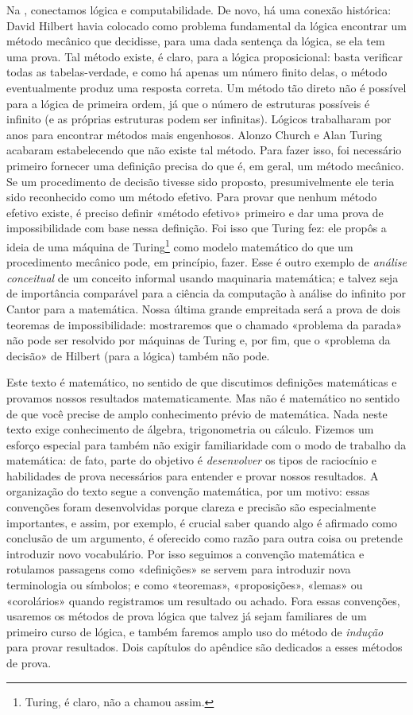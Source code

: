 Na , conectamos lógica e computabilidade. De
novo, há uma conexão histórica: David Hilbert havia colocado como
problema fundamental da lógica encontrar um método mecânico que
decidisse, para uma dada sentença da lógica, se ela tem uma prova. Tal
método existe, é claro, para a lógica proposicional: basta verificar
todas as tabelas-verdade, e como há apenas um número finito delas, o
método eventualmente produz uma resposta correta. Um método tão direto
não é possível para a lógica de primeira ordem, já que o número de
estruturas possíveis é infinito (e as próprias estruturas podem ser
infinitas). Lógicos trabalharam por anos para encontrar métodos mais
engenhosos. Alonzo Church e Alan Turing acabaram estabelecendo que não
existe tal método. Para fazer isso, foi necessário primeiro fornecer uma
definição precisa do que é, em geral, um método mecânico. Se um
procedimento de decisão tivesse sido proposto, presumivelmente ele
teria sido reconhecido como um método efetivo. Para provar que nenhum
método efetivo existe, é preciso definir «método efetivo» primeiro e
dar uma prova de impossibilidade com base nessa definição. Foi isso
que Turing fez: ele propôs a ideia de uma máquina de
Turing\footnote{Turing, é claro, não a chamou assim.} como modelo
matemático do que um procedimento mecânico pode, em princípio, fazer.
Esse é outro exemplo de \emph{análise conceitual} de um conceito
informal usando maquinaria matemática; e talvez seja de importância
comparável para a ciência da computação à análise do infinito por
Cantor para a matemática. Nossa última grande empreitada será a prova
de dois teoremas de impossibilidade: mostraremos que o chamado
«problema da parada» não pode ser resolvido por máquinas de Turing e,
por fim, que o «problema da decisão» de Hilbert (para a lógica)
também não pode.

Este texto é matemático, no sentido de que discutimos definições
matemáticas e provamos nossos resultados matematicamente. Mas não é
matemático no sentido de que você precise de amplo conhecimento prévio
de matemática. Nada neste texto exige conhecimento de álgebra,
trigonometria ou cálculo. Fizemos um esforço especial para também não
exigir familiaridade com o modo de trabalho da matemática: de fato,
parte do objetivo é \emph{desenvolver} os tipos de raciocínio e
habilidades de prova necessários para entender e provar nossos
resultados. A organização do texto segue a convenção matemática, por um
motivo: essas convenções foram desenvolvidas porque clareza e precisão
são especialmente importantes, e assim, por exemplo, é crucial saber
quando algo é afirmado como conclusão de um argumento, é oferecido
como razão para outra coisa ou pretende introduzir novo vocabulário.
Por isso seguimos a convenção matemática e rotulamos passagens como
«definições» se servem para introduzir nova terminologia ou símbolos; e
como «teoremas», «proposições», «lemas» ou «corolários» quando
registramos um resultado ou achado. Fora essas convenções, usaremos os
métodos de prova lógica que talvez já sejam familiares de um primeiro
curso de lógica, e também faremos amplo uso do método de
\emph{indução} para provar resultados. Dois capítulos do apêndice são
dedicados a esses métodos de prova.

